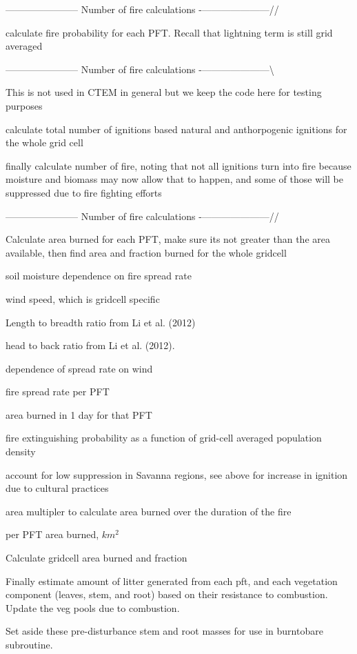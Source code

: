 ----------------------- Number of fire calculations -\/---------------------//

calculate fire probability for each P\+F\+T. Recall that lightning term is still grid averaged

----------------------- Number of fire calculations -\/---------------------\textbackslash{}

This is not used in C\+T\+E\+M in general but we keep the code here for testing purposes

calculate total number of ignitions based natural and anthorpogenic ignitions for the whole grid cell

finally calculate number of fire, noting that not all ignitions turn into fire because moisture and biomass may now allow that to happen, and some of those will be suppressed due to fire fighting efforts

----------------------- Number of fire calculations -\/---------------------//

Calculate area burned for each P\+F\+T, make sure it\textquotesingle{}s not greater than the area available, then find area and fraction burned for the whole gridcell

soil moisture dependence on fire spread rate

wind speed, which is gridcell specific

Length to breadth ratio from Li et al. (2012)

head to back ratio from Li et al. (2012).

dependence of spread rate on wind

fire spread rate per P\+F\+T

area burned in 1 day for that P\+F\+T

fire extinguishing probability as a function of grid-\/cell averaged population density

account for low suppression in Savanna regions, see above for increase in ignition due to cultural practices

area multipler to calculate area burned over the duration of the fire

per P\+F\+T area burned, $km^2$

Calculate gridcell area burned and fraction

Finally estimate amount of litter generated from each pft, and each vegetation component (leaves, stem, and root) based on their resistance to combustion. Update the veg pools due to combustion.

Set aside these pre-\/disturbance stem and root masses for use in burntobare subroutine.

